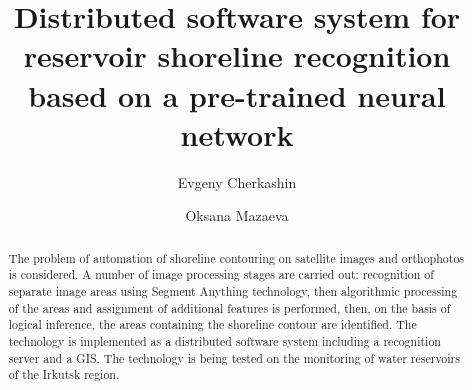 \begin{englishtitle} %
\title{Distributed software system for reservoir shoreline recognition based on a pre-trained neural network}
\author{Evgeny Cherkashin \and  Oksana Mazaeva
}

\maketitle

\begin{abstract}
The problem of automation of shoreline contouring on satellite images and orthophotos is considered. A number of image processing stages are carried out: recognition of separate image areas using Segment Anything technology, then algorithmic processing of the areas and assignment of additional features is performed, then, on the basis of logical inference, the areas containing the shoreline contour are identified. The technology is implemented as a distributed software system including a recognition server and a GIS. The technology is being tested on the monitoring of water reservoirs of the Irkutsk region.

\end{abstract}
\end{englishtitle}

\iffalse
%
%


\documentclass[12pt]{llncs}


\usepackage{iftex}

\ifPDFTeX
\usepackage[T2A]{fontenc}
\usepackage[utf8]{inputenc} %
\usepackage[english,russian]{babel}
\fi

